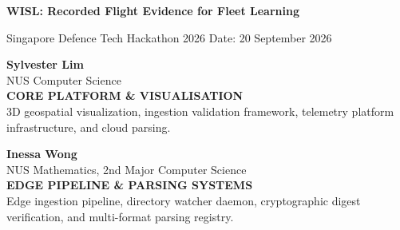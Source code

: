 \documentclass[11pt,a4paper]{article}
\begin{document}
{\sffamily\fontsize{22pt}{26pt}\selectfont\bfseries\color{primary} WISL: Recorded Flight Evidence for Fleet Learning}
\vspace{0.3em}

{\sffamily\small\color{darkslate} Singapore Defence Tech Hackathon 2026 \quad\textbar\quad Date: 20 September 2026}

\vspace{1.0em}

\noindent
\begin{minipage}[t]{0.485\textwidth}
\begin{mdframed}[style=authorcard]
\parbox[t][3.4cm][t]{\linewidth}{%
    {\sffamily\bfseries\color{primary}\large Sylvester Lim}\\[0.2em]
    {\sffamily\footnotesize\color{darkslate}NUS Computer Science}\\[0.6em]
    {\sffamily\scriptsize\bfseries\color{secondary}CORE PLATFORM \& VISUALISATION}\\[0.3em]
    {\sffamily\footnotesize\color{darkslate}3D geospatial visualization, ingestion validation framework, telemetry platform infrastructure, and cloud parsing.}
}
\end{mdframed}
\end{minipage}
\hfill
\begin{minipage}[t]{0.485\textwidth}
\begin{mdframed}[style=authorcard]
\parbox[t][3.4cm][t]{\linewidth}{%
    {\sffamily\bfseries\color{primary}\large Inessa Wong}\\[0.2em]
    {\sffamily\footnotesize\color{darkslate}NUS Mathematics, 2nd Major Computer Science}\\[0.6em]
    {\sffamily\scriptsize\bfseries\color{secondary}EDGE PIPELINE \& PARSING SYSTEMS}\\[0.3em]
    {\sffamily\footnotesize\color{darkslate}Edge ingestion pipeline, directory watcher daemon, cryptographic digest verification, and multi-format parsing registry.}
}
\end{mdframed}
\end{minipage}

\vspace{0.8em}
\end{document}
